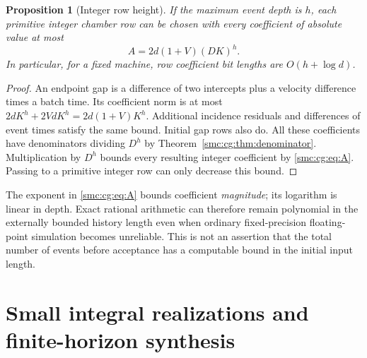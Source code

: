 \documentclass[11pt,letterpaper]{article}
\numberwithin{equation}{section}
\newtheorem{proposition}[theorem]{Proposition}
\theoremstyle{definition}
\theoremstyle{remark}
\begin{document}
\begin{proposition}[Integer row height]
\label{smc:cg:prop:height}
If the maximum event depth is $h$, each primitive integer chamber row can
be chosen with every coefficient of absolute value at most
\begin{equation}
 A=2d(1+V)(DK)^h.
 \label{smc:cg:eq:A}
\end{equation}
In particular, for a fixed machine, row coefficient bit lengths are
$O(h+\log d)$.
\end{proposition}
\begin{proof}
An endpoint gap is a difference of two intercepts plus a velocity difference
times a batch time. Its coefficient norm is at most
$2dK^h+2VdK^h=2d(1+V)K^h$. Additional incidence residuals and differences of
event times satisfy the same bound. Initial gap rows also do.
All these coefficients have denominators dividing $D^h$ by
Theorem~\ref{smc:cg:thm:denominator}. Multiplication by $D^h$ bounds every resulting
integer coefficient by \eqref{smc:cg:eq:A}. Passing to a primitive integer row can
only decrease this bound.
\end{proof}

The exponent in \eqref{smc:cg:eq:A} bounds coefficient \emph{magnitude}; its
logarithm is linear in depth. Exact rational arithmetic can therefore remain
polynomial in the externally bounded history length even when ordinary
fixed-precision floating-point simulation becomes unreliable. This is not
an assertion that the total number of events before acceptance has a
computable bound in the initial input length.

\section{Small integral realizations and finite-horizon synthesis}
\label{smc:cg:sec:small}
\end{document}
